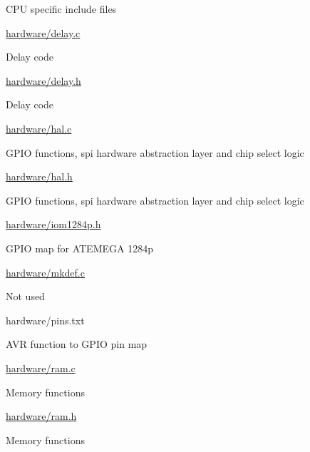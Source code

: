 \begin{DoxyItemize}
\begin{DoxyItemize}
\begin{DoxyItemize}
\item C\+PU specific include files
\end{DoxyItemize}
\item \hyperlink{delay_8c}{hardware/delay.\+c}
\begin{DoxyItemize}
\item Delay code
\end{DoxyItemize}
\item \hyperlink{delay_8h}{hardware/delay.\+h}
\begin{DoxyItemize}
\item Delay code
\end{DoxyItemize}
\item \hyperlink{hal_8c}{hardware/hal.\+c}
\begin{DoxyItemize}
\item G\+P\+IO functions, spi hardware abstraction layer and chip select logic
\end{DoxyItemize}
\item \hyperlink{hal_8h}{hardware/hal.\+h}
\begin{DoxyItemize}
\item G\+P\+IO functions, spi hardware abstraction layer and chip select logic
\end{DoxyItemize}
\item \hyperlink{iom1284p_8h}{hardware/iom1284p.\+h}
\begin{DoxyItemize}
\item G\+P\+IO map for A\+T\+E\+M\+E\+GA 1284p
\end{DoxyItemize}
\item \hyperlink{mkdef_8c}{hardware/mkdef.\+c}
\begin{DoxyItemize}
\item Not used
\end{DoxyItemize}
\item hardware/pins.\+txt
\begin{DoxyItemize}
\item A\+VR function to G\+P\+IO pin map
\end{DoxyItemize}
\item \hyperlink{ram_8c}{hardware/ram.\+c}
\begin{DoxyItemize}
\item Memory functions
\end{DoxyItemize}
\item \hyperlink{ram_8h}{hardware/ram.\+h}
\begin{DoxyItemize}
\item Memory functions
\end{DoxyItemize}

\end{DoxyItemize}
\end{DoxyItemize}
